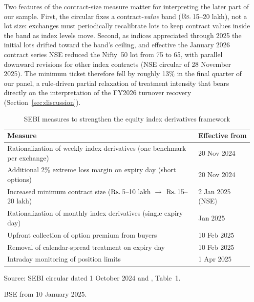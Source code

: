 \documentclass[12pt]{article}
\newcommand{\rupee}{\text{Rs.}\,}
\begin{document}
Two features of the contract-size measure matter for interpreting the later
part of our sample. First, the circular fixes a contract-\emph{value} band
(\(\text{\rupee}\)15--20 lakh), not a lot size: exchanges must periodically
recalibrate lots to keep contract values inside the band as index levels
move. Second, as indices appreciated through 2025 the initial lots drifted
toward the band's ceiling, and effective the January 2026 contract series
NSE reduced the Nifty~50 lot from 75 to 65, with parallel downward
revisions for other index contracts (NSE circular of 28 November 2025).
The minimum ticket therefore fell by roughly 13\% in the final quarter of
our panel, a rule-driven partial relaxation of treatment intensity that
bears directly on the interpretation of the FY2026 turnover recovery
(Section~\ref{sec:discussion}).

\begin{table}[H]
\centering
\caption{SEBI measures to strengthen the equity index derivatives framework}
\label{tab:measures}
\small
\begin{threeparttable}
\begin{tabular}{p{9.2cm}l}
\toprule
Measure & Effective from \\
\midrule
Rationalization of weekly index derivatives (one benchmark per exchange) & 20 Nov 2024 \\
Additional 2\% extreme loss margin on expiry day (short options) & 20 Nov 2024 \\
Increased minimum contract size (\(\text{\rupee}\)5--10 lakh $\rightarrow$ \(\text{\rupee}\)15--20 lakh) & 2 Jan 2025 (NSE)\tnote{a} \\
Rationalization of monthly index derivatives (single expiry day) & Jan 2025 \\
Upfront collection of option premium from buyers & 10 Feb 2025 \\
Removal of calendar-spread treatment on expiry day & 10 Feb 2025 \\
Intraday monitoring of position limits & 1 Apr 2025 \\
\bottomrule
\end{tabular}
\begin{tablenotes}\footnotesize
\item Source: SEBI circular dated 1 October 2024 and
\citet{sebi2025comparative}, Table~1.
\item[a] BSE from 10 January 2025.
\end{tablenotes}
\end{threeparttable}
\end{table}
\end{document}
